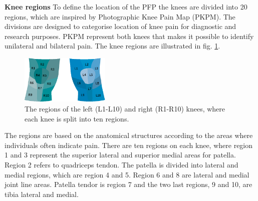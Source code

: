 \noindent
\textbf{Knee regions} \newline
\noindent
To define the location of the PFP the knees are divided into 20 regions, which are inspired by Photographic Knee Pain Map (PKPM). The divisions are designed to categorise location of knee pain for diagnostic and research purposes. PKPM represent both knees that makes it possible to identify unilateral and bilateral pain.\citep{Elson2010} The knee regions are illustrated in fig. \ref{fig:atlas}.

\begin{figure} [H] 
\centering
\includegraphics[width=0.38\textwidth]{Figures/atlas}
\caption{The regions of the left (L1-L10) and right (R1-R10) knees, where each knee is split into ten regions.}
\label{fig:atlas}
\end{figure}

\noindent
The regions are based on the anatomical structures according to the areas where individuals often indicate pain.
There are ten regions on each knee, where region 1 and 3 represent the superior lateral and superior medial areas for patella. Region 2 refers to quadriceps tendon. The patella is divided into lateral and medial regions, which are region 4 and 5. Region 6 and 8 are lateral and medial joint line areas. Patella tendor is region 7 and the two last regions, 9 and 10, are tibia lateral and medial.\citep{Elson2010}

